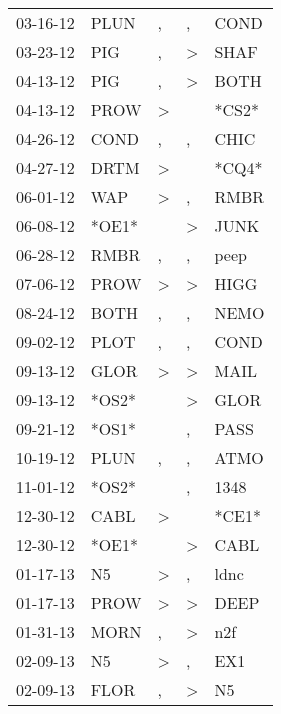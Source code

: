 \begin{supertabular}{lllll}
 03-16-12 &   PLUN &                , &                , &   COND \\
 03-23-12 &    PIG &                , &     \textgreater &   SHAF \\
 04-13-12 &    PIG &                , &     \textgreater &   BOTH \\
 04-13-12 &   PROW &     \textgreater &                  &  *CS2* \\
 04-26-12 &   COND &                , &                , &   CHIC \\
 04-27-12 &   DRTM &     \textgreater &                  &  *CQ4* \\
 06-01-12 &    WAP &     \textgreater &                , &   RMBR \\
 06-08-12 &  *OE1* &                  &     \textgreater &   JUNK \\
 06-28-12 &   RMBR &                , &                , &   peep \\
 07-06-12 &   PROW &     \textgreater &     \textgreater &   HIGG \\
 08-24-12 &   BOTH &                , &                , &   NEMO \\
 09-02-12 &   PLOT &                , &                , &   COND \\
 09-13-12 &   GLOR &     \textgreater &     \textgreater &   MAIL \\
 09-13-12 &  *OS2* &                  &     \textgreater &   GLOR \\
 09-21-12 &  *OS1* &                  &                , &   PASS \\
 10-19-12 &   PLUN &                , &                , &   ATMO \\
 11-01-12 &  *OS2* &                  &                , &   1348 \\
 12-30-12 &   CABL &     \textgreater &                  &  *CE1* \\
 12-30-12 &  *OE1* &                  &     \textgreater &   CABL \\
 01-17-13 &     N5 &     \textgreater &                , &   ldnc \\
 01-17-13 &   PROW &     \textgreater &     \textgreater &   DEEP \\
 01-31-13 &   MORN &                , &     \textgreater &    n2f \\
 02-09-13 &     N5 &     \textgreater &                , &    EX1 \\
 02-09-13 &   FLOR &                , &     \textgreater &     N5 \\

\end{supertabular}
